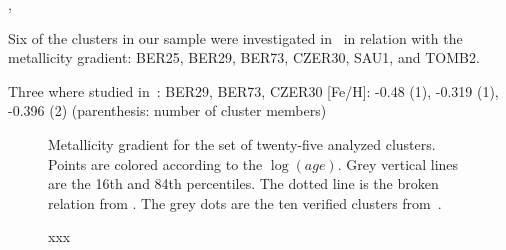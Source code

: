 \documentclass[draft]{aa}
\begin{document}
  \cite{Donor_2020}, 

  Six of the clusters in our sample were investigated in~\cite{Netopil_2021} in
  relation with the metallicity gradient: BER25, BER29, BER73, CZER30, SAU1,
  and TOMB2.

  Three where studied in~\cite{Spina_2021}: BER29, BER73, CZER30
  [Fe/H]: -0.48 (1), -0.319 (1), -0.396 (2)
  (parenthesis: number of cluster members)


  \begin{figure}
   \caption{Metallicity gradient for the set of twenty-five analyzed clusters.
   Points are colored according to the $\log(age)$. Grey vertical lines are the
   16th and 84th percentiles. The dotted line is the broken relation from 
   \citet[][Fig 7]{Donor_2020}. The grey dots are the ten verified clusters
   from~\cite{Perren_2020}.}
   \label{fig:met_gradient}
  \end{figure}

  \cite{Salaris_2004}

  \begin{figure}
   \caption{xxx}
   \label{fig:age_vs_feh}
  \end{figure}
\end{document}
